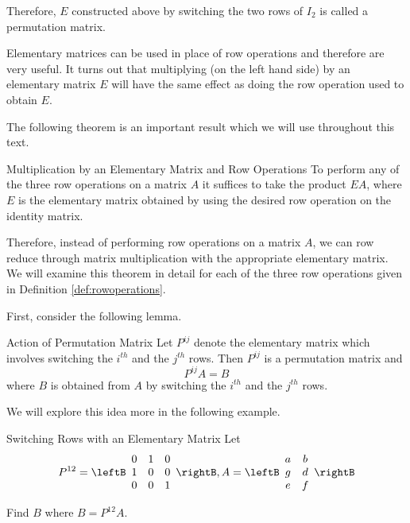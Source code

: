 Therefore, $E$ constructed above by switching the two rows of $I_2$ is called a permutation matrix. 

Elementary matrices can be used in place of row operations and therefore are very useful. It turns
out that multiplying (on the left hand side) by an elementary matrix $E$ will have the
same effect as doing the row operation used to obtain $E$.

The following theorem is an important result which we will use throughout this text. 

\begin{theorem}{Multiplication by an Elementary Matrix and Row Operations}\label{thm:multbyelemmatrix}
To perform any of the three row operations on a matrix $A$
it suffices to take the product $EA$, where $E$ is the elementary matrix obtained by 
using the desired row operation on the identity matrix.
\end{theorem}

Therefore, instead of performing row operations on a matrix $A$, we
can row reduce through matrix multiplication with the appropriate
elementary matrix. We will examine this theorem in detail for each of
the three row operations given in Definition \ref{def:rowoperations}.

First, consider the following lemma.

\begin{lemma}{Action of Permutation Matrix}\label{lem:permutationmatrix}
Let $P^{ij}$ denote the elementary matrix which involves
switching the $i^{th}$ and the $j^{th}$ rows. Then $P^{ij}$ is a permutation matrix and 
\begin{equation*}
P^{ij}A=B
\end{equation*}
where $B$ is obtained from $A$ by switching the $i^{th}$ and the $j^{th}$
rows.
\end{lemma}

We will explore this idea more in the following example.

\begin{example}{Switching Rows with an Elementary Matrix}\label{exa:elementarymatrixswitchingrows}
Let
\begin{equation*}
P^{12} = \leftB
\begin{array}{rrr}
0 & 1 & 0 \\
1 & 0 & 0 \\
0 & 0 & 1
\end{array}
\rightB, A = \leftB
\begin{array}{cc}
a & b \\
g & d \\
e & f
\end{array}
\rightB 
\end{equation*}

Find $B$ where $B = P^{12}A$.
\end{example}

